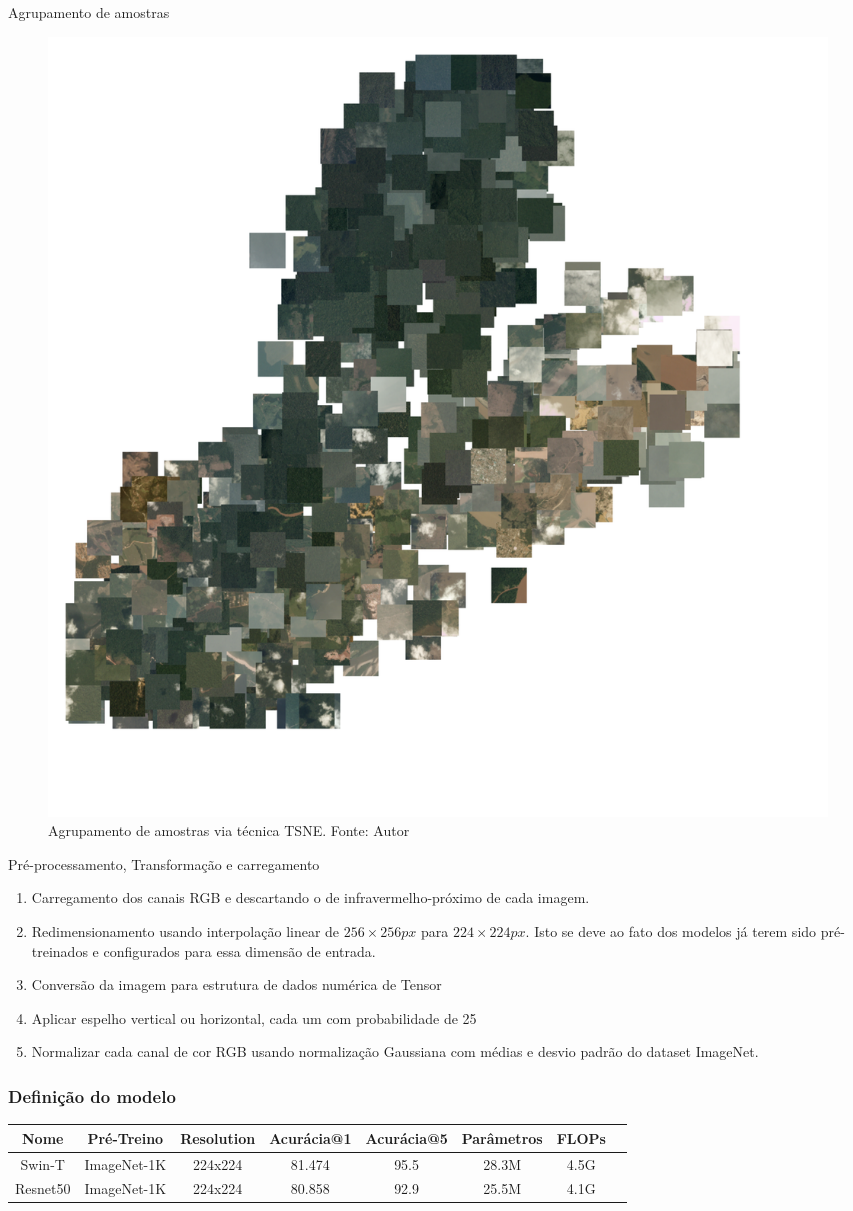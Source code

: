 \documentclass{beamer}
\begin{document}
\begin{frame}{Agrupamento de amostras}
    \begin{figure}[!ht]
        \centering
        \includegraphics[width=0.7\columnwidth]{Imagens/results/rsp-resnet-50_planet_pt/TSNE Clustering.pdf}
        \caption{Agrupamento de amostras via técnica TSNE.
        Fonte: Autor}
       \label{fig:TSNE}
    \end{figure}    
\end{frame}

\begin{frame}{Pré-processamento, Transformação e carregamento}
    \begin{enumerate}
        \item   Carregamento dos canais RGB e descartando o de infravermelho-próximo de cada imagem.
        \item   Redimensionamento usando interpolação linear de $256 \times 256px$ para $224 \times 224px$. Isto se deve ao fato dos modelos já terem sido pré-treinados e configurados para essa dimensão de entrada.
        \item   Conversão da imagem para estrutura de dados numérica de Tensor
        \item   Aplicar espelho vertical ou horizontal, cada um com probabilidade de 25%
        \item   Normalizar cada canal de cor RGB usando normalização Gaussiana com médias e desvio padrão do dataset ImageNet.
    \end{enumerate}    
\end{frame}

\begin{frame}
\frametitle{Definição do modelo}
\fontsize{7pt}{8pt}\selectfont
\begin{tabular}{*{8}{c}}
    \hline
    Nome & Pré-Treino & Resolution & Acurácia@1 & Acurácia@5 &  Parâmetros & FLOPs \\
    \hline
    Swin-T & ImageNet-1K & 224x224 & 81.474 & 95.5 &	28.3M &	4.5G \\
    Resnet50 & ImageNet-1K & 224x224 &	80.858 & 92.9 &	25.5M &	4.1G \\
    \hline
\end{tabular}
\end{frame}
\end{document}
